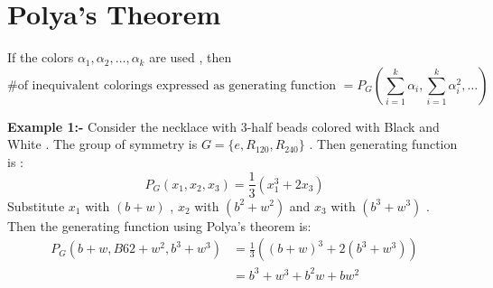 \section{Polya's Theorem}
\begin{theorem}
If the colors $\alpha_1,\alpha_2,\dots,\alpha_k$ are used , then 
$$\textrm{\# of inequivalent colorings expressed as generating function } = P_G(\sum_{i=1}^{k}\alpha_i,\sum_{i=1}^{k}\alpha_i^2,\dots)$$
\end{theorem}

\textbf{Example 1:-} Consider the necklace with $3$-half beads colored with Black and White . The group of symmetry is $G=\{e,R_{120},R_{240}\}$ . Then generating function is :
$$P_G(x_1,x_2,x_3) = \frac{1}{3}\left(x_1^3+2x_3\right)$$
Substitute $x_1$ with $(b+w)$ , $x_2$ with $(b^2+w^2)$ and $x_3$ with $(b^3+w^3)$ . Then the generating function using Polya's theorem is:
\begin{align*}
    P_G(b+w,B62+w^2,b^3+w^3) &= \frac{1}{3}\left((b+w)^3+2(b^3+w^3)\right)\\
    &= b^3+w^3+b^2w+bw^2
\end{align*}

